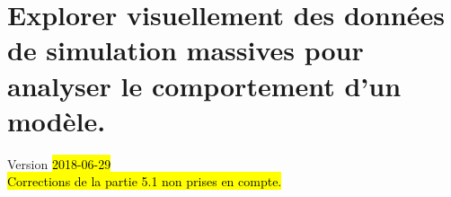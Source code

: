 \chapter{Explorer visuellement des données de simulation massives pour analyser le comportement d'un modèle.} 
\begin{center}
	{\large Version \hl{2018-06-29}}\\
	\hl{Corrections de la partie 5.1 non prises en compte.}
	
\end{center}
\minitoc

\clearpage

%
%
%
%
%
%
